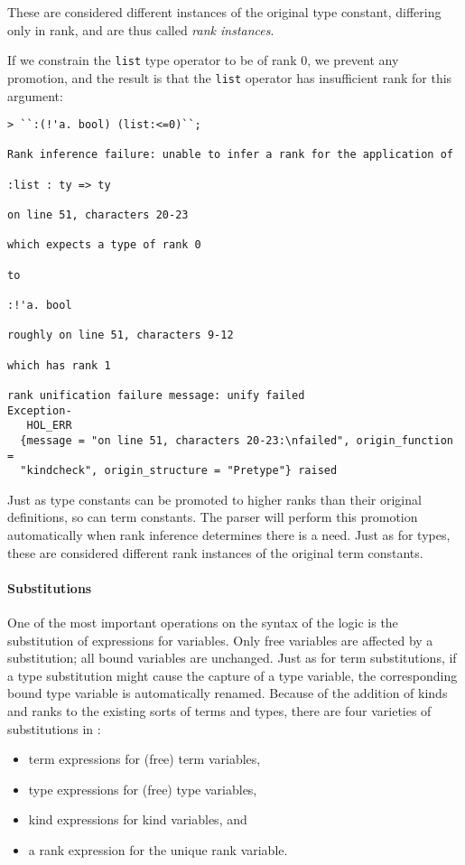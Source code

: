 These are considered different instances of the original type constant,
differing only in rank, and are thus called {\it rank instances}.

If we constrain the \texttt{list} type operator to be of rank 0,
we prevent any promotion,
and the result is that the \texttt{list}
operator has insufficient rank for this argument:
%
\begin{session}
\begin{verbatim}
> ``:(!'a. bool) (list:<=0)``;

Rank inference failure: unable to infer a rank for the application of

:list : ty => ty

on line 51, characters 20-23

which expects a type of rank 0

to

:!'a. bool

roughly on line 51, characters 9-12

which has rank 1

rank unification failure message: unify failed
Exception-
   HOL_ERR
  {message = "on line 51, characters 20-23:\nfailed", origin_function =
  "kindcheck", origin_structure = "Pretype"} raised
\end{verbatim}
\end{session}

Just as type constants can be promoted to higher ranks than their
original definitions, so can term constants.
The parser will perform this promotion automatically when
rank inference determines there is a need.  Just as for types,
these are considered different rank instances of the original term constants.



\paragraph{Substitutions}

One of the most important operations on the syntax of the \HOLW{} logic is
the substitution of expressions for variables.  Only free variables are
affected by a substitution; all bound variables are unchanged.
Just as for term substitutions, if a type substitution might cause the
capture of a type variable, the corresponding bound type variable
is automatically renamed.
Because of the addition of kinds and ranks to the existing sorts of
terms and types, there are four varieties of substitutions in \HOLW:
\begin{itemize}
\item term expressions for (free) term variables,
\item type expressions for (free) type variables,
\item kind expressions for kind variables, and
\item a rank expression for the unique rank variable.
\end{itemize}

